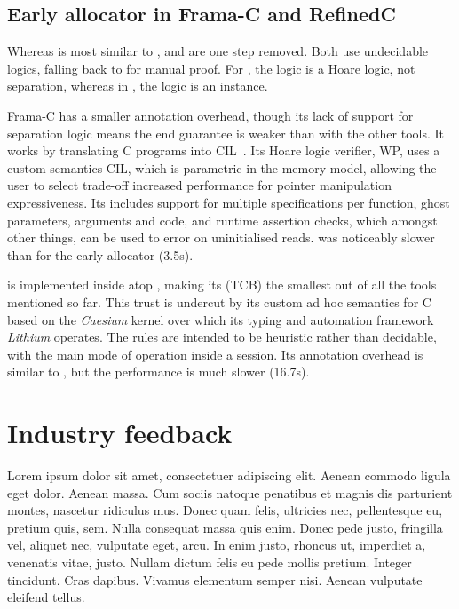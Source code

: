 \subsection{Early allocator in Frama-C and RefinedC}

Whereas  is most similar to ,  and
 are one step removed. Both use undecidable logics, falling back
to  for manual proof. For , the logic is a Hoare logic,
not separation, whereas in , the logic is an  instance.

Frama-C has a smaller annotation overhead, though its lack of support for
separation logic means the end guarantee is weaker than with the other tools.
It works by translating C programs into CIL~. Its Hoare
logic verifier, WP, uses a custom semantics CIL, which is parametric in the
memory model, allowing the user to select trade-off increased performance for
pointer manipulation expressiveness. Its includes support for multiple
specifications per function, ghost parameters, arguments and code, and runtime
assertion checks, which amongst other things, can be used to error on
uninitialised reads.  was noticeably slower than  for the
early allocator (3.5s).

 is implemented inside  atop , making its
 (TCB) the smallest out of all the tools
mentioned so far. This trust is undercut by its custom ad hoc semantics for C
based on the \emph{Caesium} kernel over which its typing and automation
framework \emph{Lithium} operates. The rules are intended to be heuristic
rather than decidable, with the main mode of operation inside a 
session. Its annotation overhead is similar to , but the performance is
much slower (16.7s).

\section{Industry feedback}

Lorem ipsum dolor sit amet, consectetuer adipiscing elit.
Aenean commodo ligula eget dolor. Aenean massa. Cum sociis natoque penatibus et
magnis dis parturient montes, nascetur ridiculus mus. Donec quam felis,
ultricies nec, pellentesque eu, pretium quis, sem. Nulla consequat massa quis
enim. Donec pede justo, fringilla vel, aliquet nec, vulputate eget, arcu. In
enim justo, rhoncus ut, imperdiet a, venenatis vitae, justo. Nullam dictum
felis eu pede mollis pretium. Integer tincidunt. Cras dapibus. Vivamus
elementum semper nisi. Aenean vulputate eleifend tellus.

